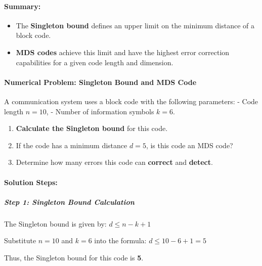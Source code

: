 \documentclass[11pt]{article}
\providecommand{\tightlist}{%
      \setlength{\itemsep}{0pt}\setlength{\parskip}{0pt}}
\begin{document}
\paragraph{\texorpdfstring{\textbf{Summary:}}{Summary:}}\label{summary}

\begin{itemize}
\tightlist
\item
  The \textbf{Singleton bound} defines an upper limit on the minimum
  distance of a block code.
\item
  \textbf{MDS codes} achieve this limit and have the highest error
  correction capabilities for a given code length and dimension.
\end{itemize}

    \paragraph{\texorpdfstring{\textbf{Numerical Problem: Singleton Bound
and MDS
Code}}{Numerical Problem: Singleton Bound and MDS Code}}\label{numerical-problem-singleton-bound-and-mds-code}

A communication system uses a block code with the following parameters:
- Code length \(n = 10\), - Number of information symbols \(k = 6\).

\begin{enumerate}
\def\labelenumi{\arabic{enumi}.}
\tightlist
\item
  \textbf{Calculate the Singleton bound} for this code.
\item
  If the code has a minimum distance \(d = 5\), is this code an MDS
  code?
\item
  Determine how many errors this code can \textbf{correct} and
  \textbf{detect}.
\end{enumerate}

\paragraph{\texorpdfstring{\textbf{Solution
Steps:}}{Solution Steps:}}\label{solution-steps}

\subparagraph{\texorpdfstring{\textbf{Step 1: Singleton Bound
Calculation}}{Step 1: Singleton Bound Calculation}}\label{step-1-singleton-bound-calculation}

The Singleton bound is given by: \(d \leq n - k + 1\)

Substitute \(n = 10\) and \(k = 6\) into the formula:
\(d \leq 10 - 6 + 1 = 5\)

Thus, the Singleton bound for this code is \textbf{5}.
\end{document}
